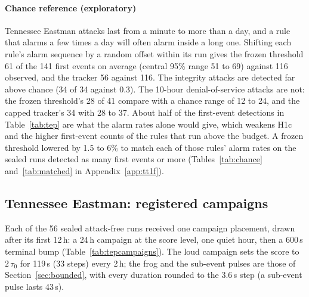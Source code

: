 \documentclass[sigconf]{acmart}
\begin{document}
\paragraph{Chance reference (exploratory)}
Tennessee Eastman attacks last from a minute to more than a day, and a rule that alarms a few times a
day will often alarm inside a long one. Shifting each rule's alarm sequence by a random offset within
its run gives the frozen threshold 61 of the 141 first events on average (central 95\% range 51 to
69) against 116 observed, and the tracker 56 against 116. The integrity attacks are detected far above
chance (34 of 34 against 0.3). The 10-hour denial-of-service attacks are not: the frozen threshold's 28
of 41 compare with a chance range of 12 to 24, and the capped tracker's 34 with 28 to 37. About half
of the first-event detections in Table~\ref{tab:tep} are what the alarm rates alone would give, which
weakens H1c and the higher first-event counts of the rules that run above the budget. A frozen
threshold lowered by 1.5 to 6\% to match each of those rules' alarm rates on the sealed runs detected
as many first events or more (Tables~\ref{tab:chance} and~\ref{tab:matched} in Appendix~\ref{app:tt1f}).

\subsection{Tennessee Eastman: registered campaigns}
\label{sec:tepcampaigns}

Each of the 56 sealed attack-free runs received one campaign placement, drawn after its first 12\,h: a
24\,h campaign at the score level, one quiet hour, then a 600\,s terminal bump
(Table~\ref{tab:tepcampaigns}). The loud campaign sets the score to $2\,\tau_0$ for 119\,s (33 steps) every 2\,h;
the frog and the sub-event pulses are those of Section~\ref{sec:bounded}, with every duration rounded
to the 3.6\,s step (a sub-event pulse lasts 43\,s).
\end{document}
